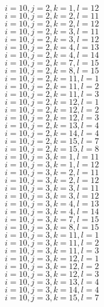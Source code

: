 \documentclass[14pt]{article}
\begin{document}
    $i=10,j=2,k=1,l=12 $ \\ 
    $i=10,j=2,k=2,l=11 $ \\ 
    $i=10,j=2,k=2,l=12 $ \\ 
    $i=10,j=2,k=3,l=11 $ \\ 
    $i=10,j=2,k=3,l=12 $ \\ 
    $i=10,j=2,k=4,l=13 $ \\ 
    $i=10,j=2,k=4,l=14 $ \\ 
    $i=10,j=2,k=7,l=15 $ \\ 
    $i=10,j=2,k=8,l=15 $ \\ 
    $i=10,j=2,k=11,l=1 $ \\ 
    $i=10,j=2,k=11,l=2 $ \\ 
    $i=10,j=2,k=11,l=3 $ \\ 
    $i=10,j=2,k=12,l=1 $ \\ 
    $i=10,j=2,k=12,l=2 $ \\ 
    $i=10,j=2,k=12,l=3 $ \\ 
    $i=10,j=2,k=13,l=4 $ \\ 
    $i=10,j=2,k=14,l=4 $ \\ 
    $i=10,j=2,k=15,l=7 $ \\ 
    $i=10,j=2,k=15,l=8 $ \\ 
    $i=10,j=3,k=1,l=11 $ \\ 
    $i=10,j=3,k=1,l=12 $ \\ 
    $i=10,j=3,k=2,l=11 $ \\ 
    $i=10,j=3,k=2,l=12 $ \\ 
    $i=10,j=3,k=3,l=11 $ \\ 
    $i=10,j=3,k=3,l=12 $ \\ 
    $i=10,j=3,k=4,l=13 $ \\ 
    $i=10,j=3,k=4,l=14 $ \\ 
    $i=10,j=3,k=7,l=15 $ \\ 
    $i=10,j=3,k=8,l=15 $ \\ 
    $i=10,j=3,k=11,l=1 $ \\ 
    $i=10,j=3,k=11,l=2 $ \\ 
    $i=10,j=3,k=11,l=3 $ \\ 
    $i=10,j=3,k=12,l=1 $ \\ 
    $i=10,j=3,k=12,l=2 $ \\ 
    $i=10,j=3,k=12,l=3 $ \\ 
    $i=10,j=3,k=13,l=4 $ \\ 
    $i=10,j=3,k=14,l=4 $ \\ 
    $i=10,j=3,k=15,l=7 $ \\ 
\end{document}
